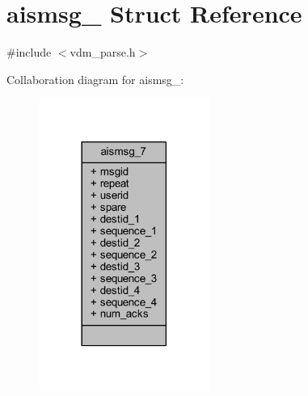 \hypertarget{structaismsg__7}{}\section{aismsg\+\_ Struct Reference}
\label{structaismsg__7}


{\ttfamily \#include $<$vdm\+\_\+parse.\+h$>$}



Collaboration diagram for aismsg\+\_\+:
\nopagebreak
\begin{figure}[H]
\begin{center}
\leavevmode
\includegraphics[width=158pt]{structaismsg__7__coll__graph}
\end{center}
\end{figure}
